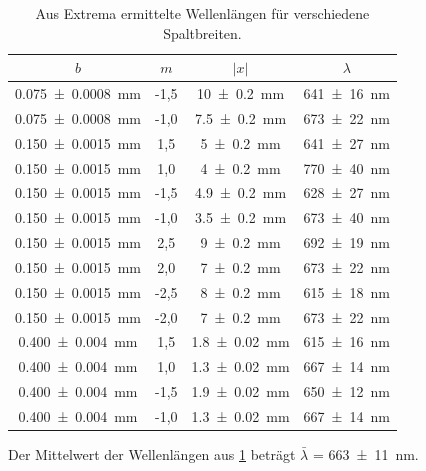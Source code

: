\documentclass[
	a4paper,
	12pt,
	pagesize,
	ngerman
]{scrartcl}
\begin{document}
	\begin{table}[H]
		\centering
		\begin{tabular}{ c | c | c | c }
			$b$ & $m$ &  $|x|$ & $\lambda$ \\ \hline
			\SI{0,075 +- 0,0008}{mm} & -1,5 & \SI{10 +- 0,2}{mm} & \SI{641 +- 16}{nm} \\
			\SI{0,075+- 0,0008}{mm} & -1,0 & \SI{7,5 +- 0,2}{mm} & \SI{673+-22}{nm} \\
			
			\SI{0,150+- 0,0015}{mm} & 1,5 & \SI{5 +- 0,2}{mm} & \SI{641+-27}{nm} \\
			\SI{0,150+- 0,0015}{mm} & 1,0 & \SI{4 +- 0,2}{mm} & \SI{770+-40}{nm} \\
			\SI{0,150+- 0,0015}{mm} & -1,5 & \SI{4,9 +- 0,2}{mm} & \SI{628+-27}{nm} \\
			\SI{0,150+- 0,0015}{mm} & -1,0 & \SI{3,5 +- 0,2}{mm} & \SI{673+-40}{nm} \\
			
			\SI{0,150+- 0,0015}{mm} & 2,5 & \SI{9 +- 0,2}{mm} & \SI{692+-19}{nm} \\
			\SI{0,150+- 0,0015}{mm} & 2,0 & \SI{7 +- 0,2}{mm} & \SI{673+-22}{nm} \\
			\SI{0,150+- 0,0015}{mm} & -2,5 & \SI{8 +- 0,2}{mm} & \SI{615+-18}{nm} \\
			\SI{0,150+- 0,0015}{mm} & -2,0 & \SI{7 +- 0,2}{mm} & \SI{673+-22}{nm} \\
			
			\SI{0,400+- 0,004}{mm} & 1,5 & \SI{1,8 +- 0,02}{mm} & \SI{615+-16}{nm} \\
			\SI{0,400+- 0,004}{mm} & 1,0 & \SI{1,3 +- 0,02}{mm} & \SI{667+-14}{nm} \\
			\SI{0,400+- 0,004}{mm} & -1,5 & \SI{1,9 +- 0,02}{mm} & \SI{650+-12}{nm} \\
			\SI{0,400+- 0,004}{mm} & -1,0 & \SI{1,3 +- 0,02}{mm} & \SI{667+-14}{nm} \\
		\end{tabular}
		\caption{Aus Extrema ermittelte Wellenlängen für verschiedene Spaltbreiten.}
		\label{Einzelspalte} 
	\end{table}
	Der Mittelwert der Wellenlängen aus \cref{Einzelspalte} beträgt $\bar{\lambda}$ = \SI{663 +- 11}{nm}.
\end{document}
